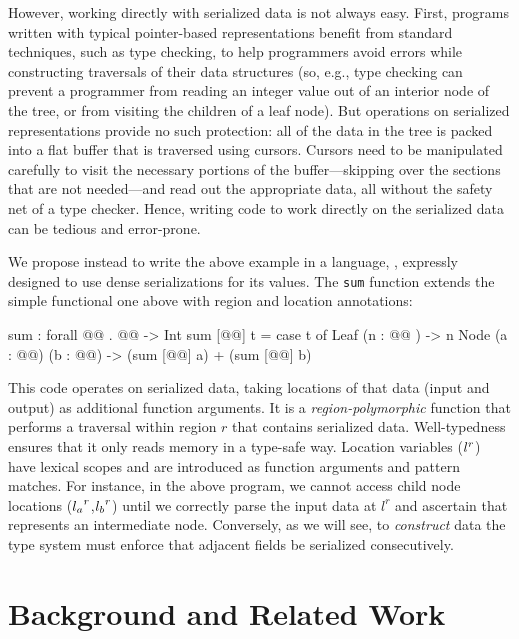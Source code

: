 \documentclass[showabstract,showacknowledgments,showpreface,showdedication]{iuphd}
\theoremstyle{nonumberplain}
\newcommand{\il}[1]{\lstinline[style=inline,mathescape=true];#1;}
\begin{document}
However, working directly with serialized data is not always easy. First,
programs written with typical pointer-based representations benefit from
standard techniques, such as type checking, to help programmers avoid errors
while constructing traversals of their data structures (so, e.g., type
checking can prevent a programmer from reading an integer value out of an
interior node of the tree, or from visiting the children of a leaf node). But
operations on serialized representations provide no such protection: all of the
data in the tree is packed into a flat buffer that is traversed using cursors.
Cursors need to be manipulated carefully to visit
the necessary portions of the buffer---skipping over the sections that are not
needed---and read out the appropriate data, all without the safety net of a
type checker. Hence, writing code to work directly on the serialized data can
be tedious and error-prone.

We propose instead to write the above example in a language, \emph{\ourcalc},
expressly designed to use dense serializations for its values.
The \ourcalc \il{sum} function extends the simple functional one above with region
and location annotations:
\begin{code}
sum : forall @@ . @@ -> Int
sum [@@] t = case t of
              Leaf (n : @@ ) -> n
              Node (a : @@) (b : @@)
               -> (sum [@@] a) + (sum [@@] b)
\end{code}
\vspace{-1mm}
This code operates on serialized data, taking locations of that data (input and
output) as additional function arguments.  It is a {\em region-polymorphic}
function that performs a traversal within region $r$ that contains serialized
data.  Well-typedness ensures that it only reads memory in a type-safe way.
%
Location variables (${l}^{r}$) have lexical scopes and are introduced as
function arguments and pattern matches.
%
For instance, in the above program, we cannot
access child node locations (${l_a}^{r}$,${l_b}^{r}$) until we correctly parse the input
data at $l^r$ and ascertain that represents an intermediate node.
%
Conversely, as we will see, to \emph{construct} data the type system must
enforce that adjacent fields be serialized consecutively.

\section{Background and Related Work}\label{sec:bg}
\end{document}

